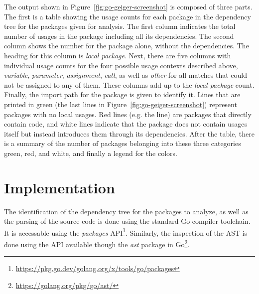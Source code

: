 

The output shown in Figure~\ref{fig:go-geiger-screenshot} is composed of three parts.
The first is a table showing the \unsafe{} usage counts for each package in the dependency tree for the packages
given for analysis.
The first column indicates the total number of usages in the package including all its dependencies.
The second column shows the number for the package alone, without the dependencies.
The heading for this column is \textit{local package}.
Next, there are five columns with individual usage counts for the four possible usage contexts described above,
\textit{variable}, \textit{parameter}, \textit{assignment}, \textit{call}, as well as \textit{other} for all matches
that could not be assigned to any of them.
These columns add up to the \textit{local package} count.
Finally, the import path for the package is given to identify it.
Lines that are printed in green (the last  lines in Figure~\ref{fig:go-geiger-screenshot}) represent
packages with no local \unsafe{} usages.
Red lines (e.g. the  line) are packages that directly contain \unsafe{} code, and white lines indicate
that the package does not contain \unsafe{} usages itself but instead introduces them through its dependencies.
After the table, there is a summary of the number of packages belonging into these three categories green, red, and
white, and finally a legend for the colors.



\section{Implementation}\label{sec:go-geiger:implementation}

The identification of the dependency tree for the packages to analyze, as well as the parsing of the source code is done
using the standard Go compiler toolchain.
It is accessable using the \textit{packages}
\acrshort{API}\footnote{\url{https://pkg.go.dev/golang.org/x/tools/go/packages}}.
Similarly, the inspection of the \acrshort{AST} is done using the \acrshort{API} available though the \textit{ast}
package in Go\footnote{\url{https://golang.org/pkg/go/ast/}}.

